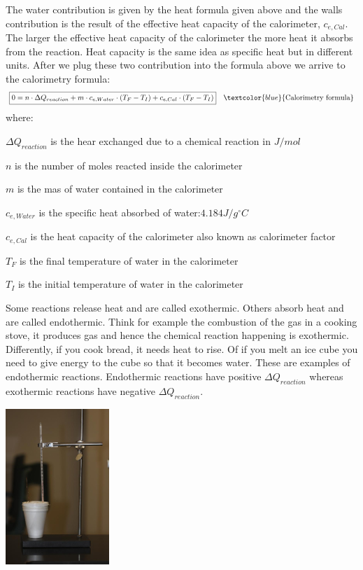 \documentclass[main.tex]{subfiles}
\begin{document}
\begin{description}
    
The water contribution is given by the heat formula given above and the walls contribution is the result of the effective heat capacity of the calorimeter, $c_{e,Cal}$. The larger the effective heat capacity of the calorimeter the more heat it absorbs from the reaction. Heat capacity is the same idea as specific heat but in different units. After we plug these two contribution into the formula above we arrive to the calorimetry formula:
\begin{equation*}\begin{split}
\boxed{  0=n\cdot\Delta Q_{reaction}+m\cdot c_{e, Water}\cdot  (T_{F}-T_{I})   +c_{e,Cal}\cdot  (T_{F}-T_{I})   } \quad \textcolor{blue}{\text{Calorimetry formula}}
\end{split}\end{equation*}
where:
\begin{where}
 \item $\Delta Q_{reaction}$   is the hear exchanged due to a chemical reaction in $J/mol$
  \item $n$   is the number of moles reacted inside the calorimeter
\item $m$ is the mas of water contained in the calorimeter 
 \item $c_{e, Water}$  is the specific heat absorbed of water:$4.184 J/g^{\circ}C$
  \item $c_{e, Cal}$  is the heat capacity of the calorimeter also known as calorimeter factor
  \item $T_{F}$  is the final temperature of water in the calorimeter
  \item $T_{I}$  is the initial temperature of water in the calorimeter
\end{where}
\item[\docfilehook{Exothermic and endothermic reactions}{Exothermic and endothermic reactions}] 
Some reactions release heat and are called exothermic. Others absorb heat and are called endothermic. Think for example the combustion of the gas in a cooking stove, it produces gas and hence the chemical reaction happening is exothermic. Differently, if you cook bread, it needs heat to rise. Of if you melt an ice cube you need to give energy to the cube so that it becomes water. These are examples of endothermic reactions. Endothermic reactions have positive  $\Delta Q_{reaction}$ whereas exothermic reactions have negative $\Delta Q_{reaction}$.
   \begin{marginfigure}[-0cm]
      \includegraphics{chapter2/figure1-7}

\end{marginfigure}
\end{description}
\end{document}
